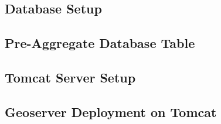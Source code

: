 \subsection{Database Setup}

\subsection{Pre-Aggregate Database Table}

\subsection{Tomcat Server Setup}

\subsection{Geoserver Deployment on Tomcat}